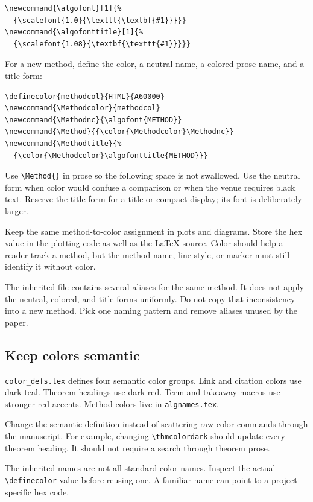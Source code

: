 \begin{verbatim}
\newcommand{\algofont}[1]{%
  {\scalefont{1.0}{\texttt{\textbf{#1}}}}}
\newcommand{\algofonttitle}[1]{%
  {\scalefont{1.08}{\textbf{\texttt{#1}}}}}
\end{verbatim}

For a new method, define the color, a neutral name, a colored prose name, and
a title form:

\begin{verbatim}
\definecolor{methodcol}{HTML}{A60000}
\newcommand{\Methodcolor}{methodcol}
\newcommand{\Methodnc}{\algofont{METHOD}}
\newcommand{\Method}{{\color{\Methodcolor}\Methodnc}}
\newcommand{\Methodtitle}{%
  {\color{\Methodcolor}\algofonttitle{METHOD}}}
\end{verbatim}

Use \texttt{\textbackslash Method\{\}} in prose so the following space is not
swallowed. Use the neutral form when color would confuse a comparison or when
the venue requires black text. Reserve the title form for a title or compact
display; its font is deliberately larger.

Keep the same method-to-color assignment in plots and diagrams. Store the hex
value in the plotting code as well as the LaTeX source. Color should help a
reader track a method, but the method name, line style, or marker must still
identify it without color.

The inherited file contains several aliases for the same method. It does not
apply the neutral, colored, and title forms uniformly. Do not copy that
inconsistency into a new method. Pick one naming pattern and remove aliases
unused by the paper.

\subsection{Keep colors semantic}

\texttt{color\_defs.tex} defines four semantic color groups. Link and citation
colors use dark teal. Theorem headings use dark red. Term and takeaway macros
use stronger red accents. Method colors live in \texttt{algnames.tex}.

Change the semantic definition instead of scattering raw color commands
through the manuscript. For example, changing
\texttt{\textbackslash thmcolordark} should update every theorem heading. It
should not require a search through theorem prose.

The inherited names are not all standard color names. Inspect the actual
\texttt{\textbackslash definecolor} value before reusing one. A familiar name
can point to a project-specific hex code.

